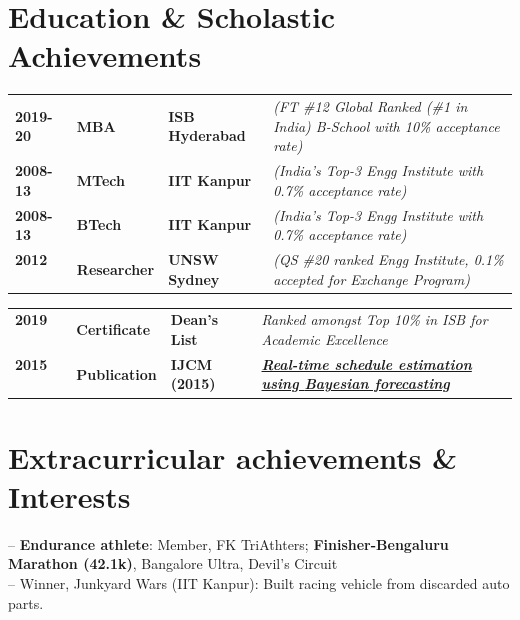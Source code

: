 \documentclass[a4paper,10.5in,13pt]{article}
\begin{document}
\section{Education \& Scholastic Achievements}
\begin{tabular}{llll}
  \textbf{2019-20} & \textbf{MBA} & \textbf{ISB Hyderabad} & \textit{(FT \#12 Global Ranked (\#1 in India) B-School with 10\% acceptance rate)}\\
  \textbf{2008-13} & \textbf{MTech}      & \textbf{IIT Kanpur}        & \textit{(India's Top-3 Engg Institute with 0.7\% acceptance rate) }       \\
  \textbf{2008-13} & \textbf{BTech}     & \textbf{IIT Kanpur}        & \textit{(India's Top-3 Engg Institute with 0.7\% acceptance rate)}       \\
  \textbf{2012 ~~~} & \textbf{Researcher}     & \textbf{UNSW Sydney}        & \textit{(QS \#20 ranked Engg Institute, 0.1\% accepted for Exchange Program)}
\end{tabular}

\hrulefill

\begin{tabular}{llll}
\textbf{2019 ~~~} & \textbf{Certificate} & \textbf{Dean's List ~} & \textit{Ranked amongst Top 10\% in ISB for Academic Excellence}\\
    \textbf{2015 ~~~} & \textbf{Publication} & \textbf{IJCM (2015) ~} & \textit{\href{https://doi.org/10.1080/15623599.2015.1117710}{\textbf{Real-time schedule estimation using \textbf{Bayesian forecasting}}}}
\end{tabular}

\section{Extracurricular achievements \& Interests}
-- \textbf{Endurance athlete}: Member, FK TriAthters; \textbf{Finisher-Bengaluru Marathon (42.1k)}, Bangalore Ultra, Devil's Circuit\\
-- Winner, Junkyard Wars (IIT Kanpur): Built racing vehicle from discarded auto parts.
\end{document}
